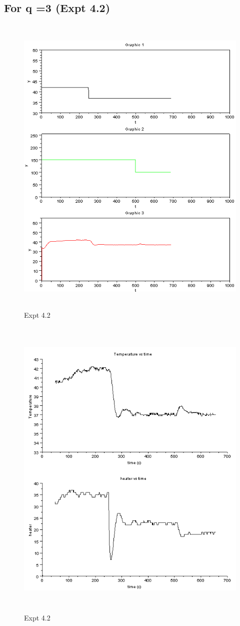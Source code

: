 \subsection{For q =3 (Expt 4.2) }
\begin{figure}[H]
  \includegraphics[width=12cm, height=15cm]{mpc/4_2.PNG}
  \caption{Expt 4.2}
\end{figure}
\begin{figure}[H]
  \includegraphics[width=12cm, height=15cm]{mpc/4_2_heater_final.png}
  \caption{Expt 4.2}
\end{figure}


